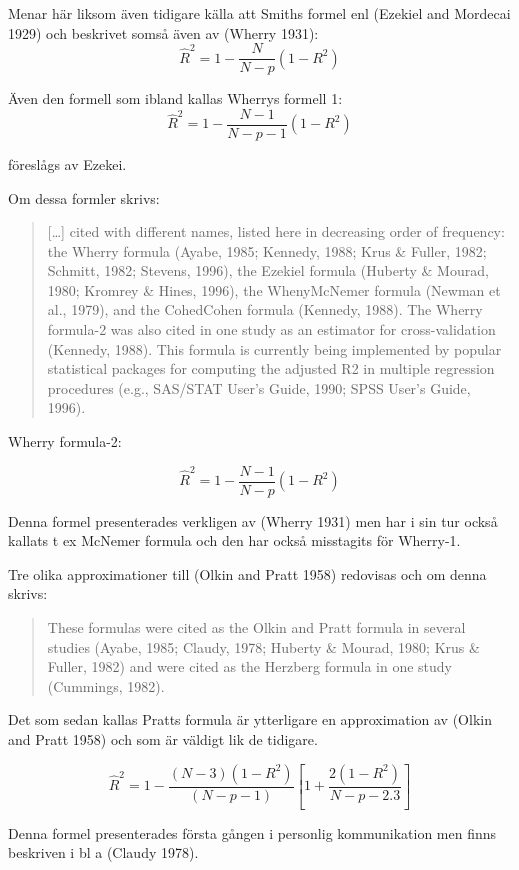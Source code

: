 \documentclass[]{article}
\begin{document}
Menar här liksom även tidigare källa att Smiths formel enl (Ezekiel and
Mordecai 1929) och beskrivet somså även av (Wherry 1931):
\[\hat{R}^2 = 1 - \frac{N}{N - p}(1 - R^2)\]

Även den formell som ibland kallas Wherrys formell 1:
\[\hat{R}^2 = 1 - \frac{N-1}{N - p-1}(1 - R^2)\]

föreslågs av Ezekei.

Om dessa formler skrivs:

\begin{quote}
{[}\ldots{}{]} cited with different names, listed here in decreasing
order of frequency: the Wherry formula (Ayabe, 1985; Kennedy, 1988; Krus
\& Fuller, 1982; Schmitt, 1982; Stevens, 1996), the Ezekiel formula
(Huberty \& Mourad, 1980; Kromrey \& Hines, 1996), the WhenyMcNemer
formula (Newman et al., 1979), and the CohedCohen formula (Kennedy,
1988). The Wherry formula-2 was also cited in one study as an estimator
for cross-validation (Kennedy, 1988). This formula is currently being
implemented by popular statistical packages for computing the adjusted
R2 in multiple regression procedures (e.g., SAS/STAT User's Guide, 1990;
SPSS User's Guide, 1996).
\end{quote}

Wherry formula-2:

\[\hat{R}^2 = 1 - \frac{N-1}{N-p}(1-R^2)\]

Denna formel presenterades verkligen av (Wherry 1931) men har i sin tur
också kallats t ex McNemer formula och den har också misstagits för
Wherry-1.

Tre olika approximationer till (Olkin and Pratt 1958) redovisas och om
denna skrivs:

\begin{quote}
These formulas were cited as the Olkin and Pratt formula in several
studies (Ayabe, 1985; Claudy, 1978; Huberty \& Mourad, 1980; Krus \&
Fuller, 1982) and were cited as the Herzberg formula in one study
(Cummings, 1982).
\end{quote}

Det som sedan kallas Pratts formula är ytterligare en approximation av
(Olkin and Pratt 1958) och som är väldigt lik de tidigare.

\[\hat{R}^2 = 1 - \frac{(N-3)(1-R^2)}{(N-p-1)}\left[1 + \frac{2(1-R^2)}{N-p-2.3}\right]\]

Denna formel presenterades första gången i personlig kommunikation men
finns beskriven i bl a (Claudy 1978).
\end{document}
